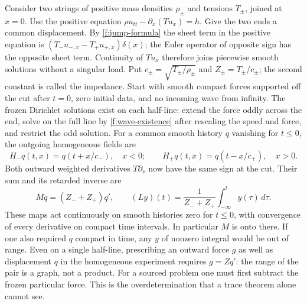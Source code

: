 Consider two strings of positive mass densities $\rho_\pm$ and tensions $T_\pm$, joined at $x=0$. Use the positive equation $\rho u_{tt}-\partial_x(Tu_x)=h$. Give the two ends a common displacement. By \eqref{f:jump-formula} the sheet term in the positive equation is $(T_-u_{-,x}-T_+u_{+,x})\delta(x)$; the Euler operator of opposite sign has the opposite sheet term. Continuity of $Tu_x$ therefore joins piecewise smooth solutions without a singular load. Put $c_\pm=\sqrt{T_\pm/\rho_\pm}$ and $Z_\pm=T_\pm/c_\pm$; the second constant is called the impedance. Start with smooth compact forces supported off the cut after $t=0$, zero initial data, and no incoming wave from infinity. The frozen Dirichlet solutions exist on each half-line: extend the force oddly across the end, solve on the full line by \eqref{f:wave-existence} after rescaling the speed and force, and restrict the odd solution. For a common smooth history $q$ vanishing for $t\leq0$, the outgoing homogeneous fields are
\[
 H_-q(t,x)=q(t+x/c_-),\quad x<0;\qquad H_+q(t,x)=q(t-x/c_+),\quad x>0 .
\]
Both outward weighted derivatives $T\partial_\nu$ now have the same sign at the cut. Their sum and its retarded inverse are
\begin{equation}
 Mq=(Z_-+Z_+)q',\qquad (Ly)(t)=\frac{1}{Z_-+Z_+}\int_{-\infty}^t y(\tau)\,d\tau .\label{f:retarded-history-lift}
\end{equation}
These maps act continuously on smooth histories zero for $t\leq0$, with convergence of every derivative on compact time intervals. In particular $M$ is onto there. If one also required $q$ compact in time, any $y$ of nonzero integral would be out of range. Even on a single half-line, prescribing an outward force $g$ as well as displacement $q$ in the homogeneous experiment requires $g=Zq'$: the range of the pair is a graph, not a product. For a sourced problem one must first subtract the frozen particular force. This is the overdetermination that a trace theorem alone cannot see.

